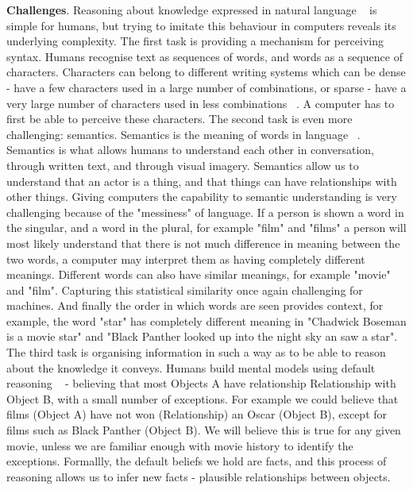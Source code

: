 \textbf{Challenges}. Reasoning about knowledge expressed in natural language ~\citep{minervini2019differentiable} is simple for humans, but trying to imitate this behaviour in computers reveals its underlying complexity. \newline 
The first task is providing a mechanism for perceiving syntax. Humans recognise text as sequences of words, and words as a sequence of characters. Characters can belong to different writing systems which can be dense - have a few characters used in a large number of combinations, or sparse - have a very large number of characters used in less combinations ~\citep{Hua2010}. A computer has to first be able to perceive these characters. \newline
The second task is even more challenging: semantics. Semantics is the meaning of words in language ~\citep{chomsky1955logical}. Semantics is what allows humans to understand each other in conversation, through written text, and through visual imagery. Semantics allow us to understand that an actor is a thing, and that things can have relationships with other things. Giving computers the capability to semantic understanding is very challenging because of the "messiness" of language. If a person is shown a word in the singular, and a word in the plural, for example "film" and "films" a person will most likely understand that there is not much difference in meaning between the two words, a computer may interpret them as having completely different meanings. Different words can also have similar meanings, for example "movie" and "film". Capturing this statistical similarity once again challenging for machines. And finally the order in which words are seen provides context, for example, the word "star" has completely different meaning in "Chadwick Boseman is a movie star" and "Black Panther looked up into the night sky an saw a star". \newline
The third task is organising information in such a way as to be able to reason about the knowledge it conveys. Humans build mental models using default reasoning ~\citep{reiter1980logic} - believing that most Objects A have relationship Relationship with Object B, with a small number of exceptions. For example we could believe that films (Object A) have not won (Relationship) an Oscar (Object B), except for films such as Black Panther (Object B). We will believe this is true for any given movie, unless we are familiar enough with movie history to identify the exceptions. Formallly, the default beliefs we hold are facts, and this process of reasoning allows us to infer new facts - plausible relationships between objects. \newline
